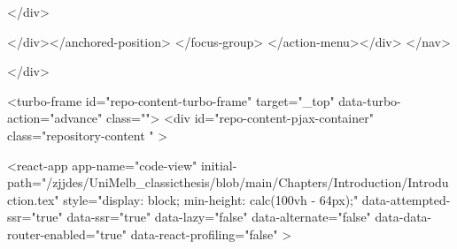</div>
      
</div></anchored-position>  </focus-group>
</action-menu></div>
</nav>

  </div>
  



<turbo-frame id="repo-content-turbo-frame" target="_top" data-turbo-action="advance" class="">
    <div id="repo-content-pjax-container" class="repository-content " >
    



    
      
    








<react-app
  app-name="code-view"
  initial-path="/zjjdes/UniMelb_classicthesis/blob/main/Chapters/Introduction/Introduction.tex"
  style="display: block; min-height: calc(100vh - 64px);"
  data-attempted-ssr="true"
  data-ssr="true"
  data-lazy="false"
  data-alternate="false"
  data-data-router-enabled="true"
  data-react-profiling="false"
>
  

